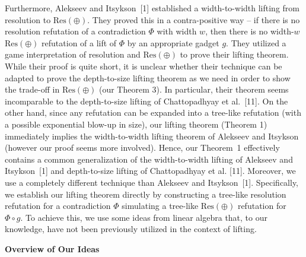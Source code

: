 Furthermore, Alekseev and Itsykson [1] established a width-to-width lifting from resolution to $\text{Res}(\oplus)$.
They proved this in a contra-positive way – if there is no resolution refutation of a contradiction $\Phi$ with width $w$, then there is no width-$w$ $\text{Res}(\oplus)$ refutation of a lift of $\Phi$ by an appropriate gadget $g$.
They utilized a game interpretation of resolution and $\text{Res}(\oplus)$ to prove their lifting theorem.
While their proof is quite short, it is unclear whether their technique can be adapted to prove the depth-to-size lifting theorem as we need in order to show the trade-off in $\text{Res}(\oplus)$ (our Theorem 3). In particular, their theorem seems incomparable to the depth-to-size lifting of Chattopadhyay et al. [11].
On the other hand, since any refutation can be expanded into a tree-like refutation (with a possible exponential blow-up in size), our lifting theorem (Theorem 1) immediately implies the width-to-width lifting theorem of Alekseev and Itsykson (however our proof seems more involved). Hence, our Theorem 1 effectively contains a common generalization of the width-to-width lifting of Alekseev and Itsykson [1] and depth-to-size lifting of Chattopadhyay et al. [11].
Moreover, we use a completely different technique than Alekseev and Itsykson [1].
Specifically, we establish our lifting theorem directly by constructing a tree-like resolution refutation for a contradiction $\Phi$ simulating a tree-like $\text{Res}(\oplus)$ refutation for $\Phi\circ g$.
To achieve this, we use some ideas from linear algebra that, to our knowledge, have not been previously utilized in the context of lifting.\par





\par\medskip\noindent\textbf{Overview of Our Ideas}\par




